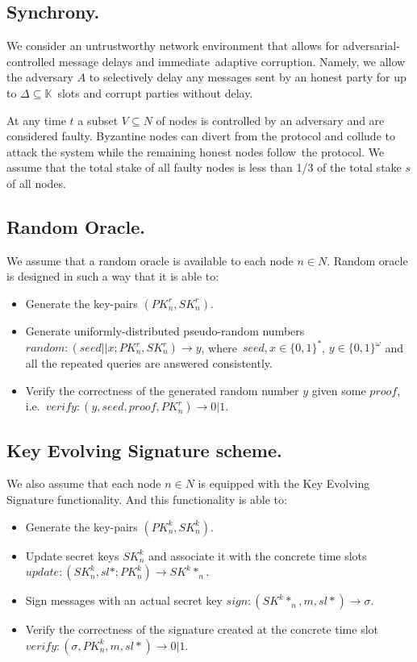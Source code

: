 \subsection{Synchrony.}\label{subsec:synchrony.}
We consider an untrustworthy network environment that allows for adversarial-controlled message delays and immediate\
adaptive corruption.
Namely, we allow the adversary $A$ to selectively delay any messages sent by an honest party for up to $\Delta \subseteq \mathbb{K}$\
slots and corrupt parties without delay.

At any time $t$ a subset ${V \subseteq N}$ of nodes is controlled by an adversary and are considered faulty.
Byzantine nodes can divert from the protocol and collude to attack the system while the remaining honest nodes follow\
the protocol.
We assume that the total stake of all faulty nodes is less than 1/3 of the total stake $s$ of all nodes.

\subsection{Random Oracle.}\label{subsec:random-oracle.}
We assume that a random oracle is available to each node $n \in N$.
Random oracle is designed in such a way that it is able to:
\begin{itemize}
    \item Generate the key-pairs ${(PK^r_n, SK^r_n)}$.
    \item Generate uniformly-distributed pseudo-random numbers ${random: (seed || x; PK^r_n, SK^r_n) \rightarrow y}$, where\
    ${seed, x \in \{0,1\}^*}$, ${y \in \{0,1\}^\omega}$ and all the repeated queries are answered consistently.
    \item Verify the correctness of the generated random number $y$ given some $proof$, i.e.\
    ${verify: (y, seed, proof, PK^r_n) \rightarrow 0 | 1}$.
\end{itemize}

\subsection{Key Evolving Signature scheme.}\label{subsec:key-evolving.}
We also assume that each node $n \in N$ is equipped with the Key Evolving Signature functionality.
And this functionality is able to:
\begin{itemize}
    \item Generate the key-pairs ${(PK^k_n, SK^k_n)}$.
    \item Update secret keys $SK^k_n$ and associate it with the concrete time slots\
    ${update: (SK^k_n, sl*; PK^k_n) \rightarrow SK^k*_n}$.
    \item Sign messages with an actual secret key ${sign: (SK^k*_n, m, sl*) \rightarrow \sigma}$.
    \item Verify the correctness of the signature created at the concrete time slot\
    ${verify: (\sigma, PK^k_n, m, sl*) \rightarrow 0 | 1}$.
\end{itemize}

